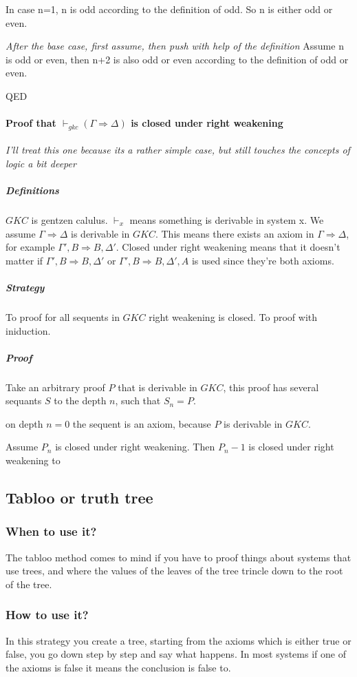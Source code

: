 \documentclass{article}
\begin{document}
In case n=1, n is odd according to the definition of odd. So n is either
odd or even.

\emph{After the base case, first assume, then push with help of the definition}
Assume n is odd or even, then n+2 is also odd or even according to the
definition of odd or even.

QED

\paragraph{Proof that $\vdash_{gkc} (\Gamma \Rightarrow \Delta)$ is
closed under right weakening}
\emph{I'll treat this one because its a rather simple case, but still
touches the concepts of logic a bit deeper}

\subparagraph{Definitions}
$GKC$ is gentzen calulus. $\vdash_x$ means something is derivable in system x.
We assume $\Gamma \Rightarrow \Delta$ is derivable in $GKC$. This means
there exists an axiom in $\Gamma \Rightarrow \Delta$, for example
$\Gamma', B \Rightarrow B, \Delta'$.
Closed under right weakening means that it doesn't matter if
$\Gamma', B \Rightarrow B, \Delta'$ or $\Gamma', B \Rightarrow B, \Delta', A$
is used since they're both axioms.

\subparagraph{Strategy} To proof for all sequents in $GKC$ right weakening
is closed. To proof with iniduction.
\subparagraph{Proof}
Take an arbitrary proof $P$ that is derivable in $GKC$,
this proof has several sequants $S$ to the depth $n$, such that $S_n = P$.

on depth $n=0$ the sequent is an axiom, because $P$ is derivable in $GKC$.

Assume $P_n$ is closed under right weakening. Then $P_n-1$ is closed under
right weakening to

\subsection{Tabloo or truth tree}
\subsubsection{When to use it?}
The tabloo method comes to mind if you have to proof things about systems
that use trees, and where the values of the leaves of the tree trincle down
to the root of the tree.

\subsubsection{How to use it?}
In this strategy you create a tree, starting from the axioms which is either
true or false, you go down step by step and say what happens. In most systems
if one of the axioms is false it means the conclusion is false to.
\end{document}
